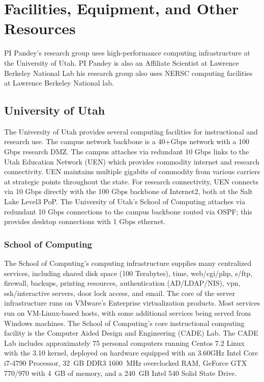 
\section*{Facilities, Equipment, and Other Resources}

PI Pandey's research group uses high-performance computing infrastructure at the University of Utah. PI Pandey is also an Affiliate Scientist at Lawrence Berkeley National Lab his research group also uses NERSC computing facilities at Lawrence Berkeley National lab.

\subsection*{University of Utah}
The University of Utah provides several computing facilities for instructional and research use. The campus network backbone is a 40+Gbps network with a 100 Gbps research DMZ\@. The campus attaches via redundant 10 Gbps links to the Utah Education Network (UEN) which provides commodity internet and research connectivity. UEN maintains multiple gigabits of commodity from various carriers at strategic points throughout the state. For research connectivity, UEN connects via 10 Gbps directly with the 100 Gbps backbone of Internet2, both at the Salt Lake Level3 PoP. The University of Utah’s School of Computing attaches via redundant 10 Gbps connections to the campus backbone routed via OSPF\@; this provides desktop connections with 1 Gbps ethernet.

\subsubsection*{School of Computing}
The School of Computing’s computing infrastructure supplies many centralized services, including shared disk space (100 Terabytes), time, web/cgi/php, s/ftp, firewall, backups, printing resources, authentication (AD/LDAP/NIS), vpn, ssh/interactive servers, door lock access, and email. The core of the server infrastructure runs on VMware’s Enterprise virtualization products. Most services run on VM-Linux-based hosts, with some additional services being served from Windows machines. The School of Computing’s core instructional computing facility is the Computer Aided Design and Engineering (CADE) Lab. The CADE Lab includes approximately 75 personal computers running Centos 7.2 Linux with the 3.10 kernel, deployed on hardware equipped with an 3.60GHz Intel Core i7-4790 Processor, 32~GB DDR3 1600~MHz overclocked RAM, GeForce GTX 770/970 with 4~GB of memory, and a 240~GB Intel 540 Solid State Drive.

